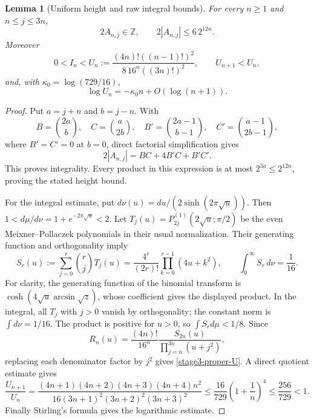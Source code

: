 \documentclass[11pt,a4paper]{article}
\newtheorem{lemma}[theorem]{Lemma}
\theoremstyle{definition}
\theoremstyle{remark}
\begin{document}
\begin{lemma}[Uniform height and raw integral bounds]
\label{stage3-proper-bounds}
For every $n\ge1$ and $n\le j\le3n$,
\[
 2A_{n,j}\in\mathbb Z,\qquad
 2|A_{n,j}|\le6\,2^{12n}.
\]
Moreover
\begin{equation}\label{stage3-proper-U}
 0<I_n<U_n:=
 \frac{(4n)!((n-1)!)^2}{8\,16^n((3n)!)^2},
 \qquad U_{n+1}<U_n,
\end{equation}
and, with $\kappa_0=\log(729/16)$,
\[
 \log U_n=-\kappa_0 n+O(\log(n+1)).
\]
\end{lemma}

\begin{proof}
Put $a=j+n$ and $b=j-n$. With
\[
 B=\binom{2a}{b},\quad C=\binom a{2b},\quad
 B'=\binom{2a-1}{b-1},\quad C'=\binom{a-1}{2b-1},
\]
where $B'=C'=0$ at $b=0$, direct factorial simplification gives
\[
 2|A_{n,j}|=BC+4B'C+B'C'.
\]
This proves integrality. Every product in this expression is at most
$2^{3a}\le2^{12n}$, proving the stated height bound.

For the integral estimate, put
$d\nu(u)=du/(2\sinh(2\pi\sqrt u))$. Then
$1<d\mu/d\nu=1+e^{-2\pi\sqrt u}<2$.
Let $T_j(u)=P_{2j}^{(1)}(2\sqrt u;\pi/2)$ be the even
Meixner--Pollaczek polynomials in their usual normalization.
Their generating function and orthogonality
\cite{dlmf-mp,dlmf-mp-generating} imply
\[
 S_r(u):=\sum_{j=0}^r\binom rj T_j(u)
       =\frac{4^r}{(2r)!}\prod_{k=0}^{r-1}(4u+k^2),
 \qquad \int_0^\infty S_r\,d\nu=\frac1{16}.
\]
For clarity, the generating function of the binomial transform is
$\cosh(4\sqrt u\arcsin\sqrt z)$, whose coefficient gives the displayed
product. In the integral, all $T_j$ with $j>0$ vanish by orthogonality;
the constant norm is $\int d\nu=1/16$. The product is positive for
$u>0$, so $\int S_r d\mu<1/8$.
Since
\[
 R_n(u)=\frac{(4n)!}{16^n}
          \frac{S_{2n}(u)}{\prod_{j=n}^{3n}(u+j^2)},
\]
replacing each denominator factor by $j^2$ gives
\eqref{stage3-proper-U}. A direct quotient estimate gives
\[
 \frac{U_{n+1}}{U_n}
 =\frac{(4n+1)(4n+2)(4n+3)(4n+4)n^2}
 {16(3n+1)^2(3n+2)^2(3n+3)^2}
 \le\frac{16}{729}\left(1+\frac1n\right)^4
 \le\frac{256}{729}<1.
\]
Finally Stirling's formula gives the logarithmic estimate.
\end{proof}
\end{document}
